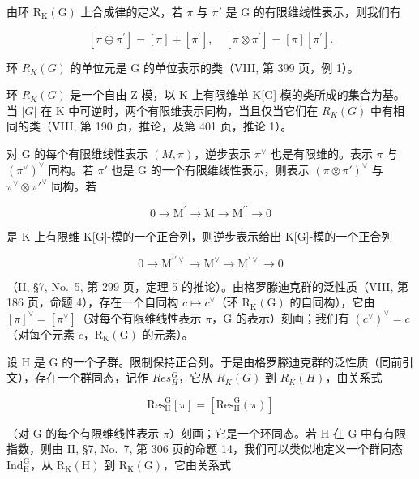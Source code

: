 由环 \(\mathrm{R}_{\mathrm{K}}(\mathrm{G})\) 上合成律的定义，若 \(\pi\) 与 \(\pi'\) 是 G 的有限维线性表示，则我们有

\[
[ \pi \oplus \pi^ {\prime} ] = [ \pi ] + [ \pi^ {\prime} ], \quad [ \pi \otimes \pi^ {\prime} ] = [ \pi ] [ \pi^ {\prime} ].
\]

环 \(R_{K}(G)\) 的单位元是 G 的单位表示的类（VIII, 第 399 页，例 1）。

环 \(R_{K}(G)\) 是一个自由 Z-模，以 K 上有限维单 K{[}G{]}-模的类所成的集合为基。当 \(|G|\) 在 K 中可逆时，两个有限维表示同构，当且仅当它们在 \(R_{K}(G)\) 中有相同的类（VIII, 第 190 页，推论，及第 401 页，推论 1）。

对 G 的每个有限维线性表示 \((M,\pi)\)，逆步表示 \(\pi^{\vee}\) 也是有限维的。表示 \(\pi\) 与 \((\pi^{\vee})^{\vee}\) 同构。若 \(\pi'\) 也是 G 的一个有限维线性表示，则表示 \((\pi\otimes\pi')^{\vee}\) 与 \(\pi^{\vee}\otimes\pi'^{\vee}\) 同构。若

\[
0 \longrightarrow \mathrm{M} ^ {\prime} \longrightarrow \mathrm{M} \longrightarrow \mathrm{M} ^ {\prime \prime} \longrightarrow 0
\]

是 K 上有限维 K{[}G{]}-模的一个正合列，则逆步表示给出 K{[}G{]}-模的一个正合列

\[
0 \longrightarrow \mathrm{M} ^ {\prime \prime \vee} \longrightarrow \mathrm{M} ^ {\vee} \longrightarrow \mathrm{M} ^ {\prime \vee} \longrightarrow 0
\]

（II, §7, No.~5, 第 299 页，定理 5 的推论）。由格罗滕迪克群的泛性质（VIII, 第 186 页，命题 4），存在一个自同构 \(c \mapsto c^{\vee}\)（环 \(\mathrm{R}_{\mathrm{K}}(\mathrm{G})\) 的自同构），它由 \([\pi]^{\vee} = [\pi^{\vee}]\)（对每个有限维线性表示 \(\pi\)，\(\mathrm{G}\) 的表示）刻画；我们有 \((c^{\vee})^{\vee} = c\)（对每个元素 \(c\)，\(\mathrm{R}_{\mathrm{K}}(\mathrm{G})\) 的元素）。

设 H 是 G 的一个子群。限制保持正合列。于是由格罗滕迪克群的泛性质（同前引文），存在一个群同态，记作 \(Res_{H}^{G}\)，它从 \(R_{K}(G)\) 到 \(R_{K}(H)\)，由关系式

\[
\mathrm{Res} _ {\mathrm{H}} ^ {\mathrm{G}} [ \pi ] = [ \mathrm{Res} _ {\mathrm{H}} ^ {\mathrm{G}} (\pi) ]\tag{6}
\]

（对 G 的每个有限维线性表示 \(\pi\)）刻画；它是一个环同态。若 H 在 G 中有有限指数，则由 II, §7, No.~7, 第 306 页的命题 14，我们可以类似地定义一个群同态 \(\mathrm{Ind}_{\mathrm{H}}^{\mathrm{G}}\)，从 \(\mathrm{R}_{\mathrm{K}}(\mathrm{H})\) 到 \(\mathrm{R}_{\mathrm{K}}(\mathrm{G})\)，它由关系式


